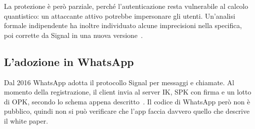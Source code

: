 La protezione è però parziale, perché l'autenticazione resta vulnerabile al calcolo
quantistico: un attaccante attivo potrebbe impersonare gli utenti. Un'analisi formale
indipendente ha inoltre individuato alcune imprecisioni nella specifica, poi corrette da Signal in una nuova
versione~\cite{cryspenpqxdh}.

\subsection{L'adozione in WhatsApp}\label{sec:whatsapp}

Dal 2016 WhatsApp adotta il protocollo Signal per messaggi e chiamate. Al momento della
registrazione, il client invia al server IK, SPK con firma e un lotto di OPK, secondo lo
schema appena descritto~\cite{whatsappwhitepaper}. Il codice di WhatsApp però non è
pubblico, quindi non si può verificare che l'app faccia davvero quello che descrive il
white paper.
